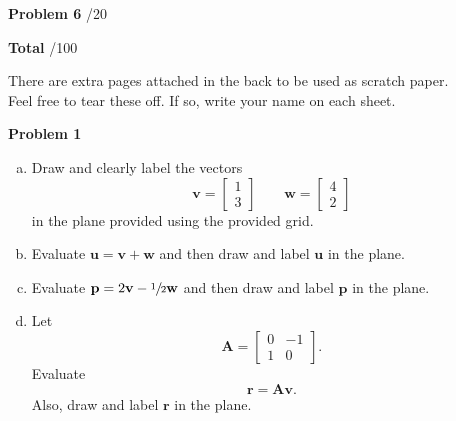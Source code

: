 \documentclass[12pt]{amsbook}
\begin{document}
\textbf{Problem 6} \; \underline{\hspace{1cm}}/20

\vspace{.5cm}

\textbf{Total} \;\hspace{1.1cm} \underline{\hspace{1.25cm}}/100

\vspace*{4cm}


\begin{center}\large{There are extra pages attached in the back to be used as scratch paper.\\

Feel free to tear these off. If so, write your name on each sheet.}\end{center}










\newpage

\textbf{Problem 1}

\vspace{.25cm}

\begin{enumerate}[(a)]
    \item Draw and clearly label the vectors
\[
\mathbf{v}=\begin{bmatrix} 1 \\ 3 \end{bmatrix} \qquad \mathbf{w}=\begin{bmatrix} 4 \\ 2 \end{bmatrix}
\]
in the plane provided using the provided grid.

\item Evaluate $\mathbf{u}=\mathbf{v}+\mathbf{w}$ and then draw and label $\mathbf{u}$ in the plane.

\item Evaluate $\mathbf{p}=2\mathbf{v}-\sfrac{1}{2}\mathbf{w}$ and then draw and label $\mathbf{p}$ in the plane.

\item Let
\[
\mathbf{A}=\begin{bmatrix} 0 & -1\\ 1 & 0 \end{bmatrix}.
\]
Evaluate
\[
\mathbf{r}=\mathbf{A}\mathbf{v}.
\]
Also, draw and label $\mathbf{r}$ in the plane. 
\end{enumerate}
\end{document}
